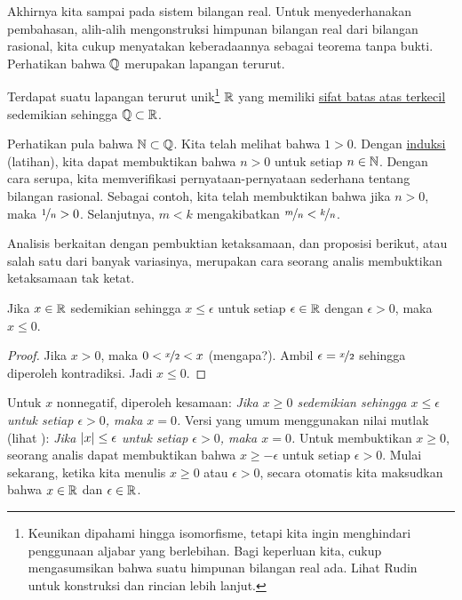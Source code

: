 Akhirnya kita sampai pada sistem bilangan real.  Untuk menyederhanakan pembahasan, alih-alih mengonstruksi
himpunan bilangan real dari bilangan rasional, kita cukup menyatakan keberadaannya
sebagai teorema tanpa bukti.  Perhatikan bahwa ${\mathbb{Q}}$ merupakan
lapangan terurut.

\begin{thm}
Terdapat suatu lapangan terurut unik\footnote{Keunikan dipahami hingga isomorfisme, tetapi kita ingin
menghindari penggunaan aljabar yang berlebihan.  Bagi keperluan kita, cukup mengasumsikan
bahwa suatu himpunan bilangan real ada.  Lihat Rudin~\cite{Rudin:baby} untuk
konstruksi dan rincian lebih lanjut.}
${\mathbb{R}}$ yang memiliki \hyperref[defn:lub]{sifat batas atas terkecil}
sedemikian sehingga ${\mathbb{Q}} \subset {\mathbb{R}}$.
\end{thm}

Perhatikan pula bahwa ${\mathbb{N}} \subset {\mathbb{Q}}$.  Kita telah melihat bahwa $1 > 0$.
Dengan \hyperref[induction:thm]{induksi} (latihan),
kita dapat membuktikan bahwa $n > 0$ untuk setiap $n \in {\mathbb{N}}$.
Dengan cara serupa, kita memverifikasi pernyataan-pernyataan sederhana tentang bilangan rasional.
Sebagai contoh, kita telah membuktikan bahwa jika $n > 0$, maka $\nicefrac{1}{n} > 0$.
Selanjutnya, $m < k$ mengakibatkan $\nicefrac{m}{n} < \nicefrac{k}{n}$.

Analisis berkaitan dengan pembuktian ketaksamaan, dan
proposisi berikut, atau salah satu dari banyak variasinya,
merupakan cara seorang analis membuktikan ketaksamaan tak ketat.

\begin{prop}
Jika $x \in {\mathbb{R}}$ sedemikian sehingga $x \leq \epsilon$ untuk setiap
$\epsilon \in {\mathbb{R}}$ dengan
$\epsilon > 0$, maka $x \leq 0$.
\end{prop}

\begin{proof}
Jika $x > 0$, maka $0 < \nicefrac{x}{2} < x$ (mengapa?).  Ambil
$\epsilon = \nicefrac{x}{2}$ sehingga diperoleh kontradiksi.  Jadi $x \leq 0$.
\end{proof}

Untuk $x$ nonnegatif, diperoleh kesamaan:
\emph{Jika $x \geq 0$ sedemikian sehingga $x \leq \epsilon$ untuk setiap
$\epsilon > 0$, maka $x = 0$.}
Versi yang umum menggunakan nilai mutlak (lihat ):
\emph{Jika $\lvert {x} \rvert \leq \epsilon$ untuk setiap
$\epsilon > 0$, maka $x = 0$.}
Untuk membuktikan $x \geq 0$, seorang analis dapat membuktikan
bahwa $x \geq -\epsilon$ untuk setiap $\epsilon > 0$.
Mulai sekarang, ketika kita menulis $x \geq 0$ atau
$\epsilon > 0$, secara otomatis kita maksudkan bahwa $x \in {\mathbb{R}}$ dan $\epsilon \in {\mathbb{R}}$.

